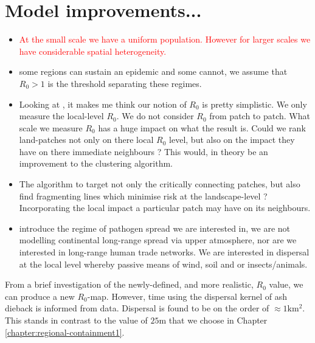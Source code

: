 \section{Model improvements...}
\begin{itemize}
    \item \textcolor{red}{At the small scale we have a uniform population. However for larger scales we have considerable spatial heterogeneity.}
    \item some regions can sustain an epidemic and some cannot, we assume that $R_0>1$ is the threshold separating these regimes.
    \item Looking at \cite{R0-perc-ref}, it makes me think our notion of $R_0$ is pretty simplistic. We only measure the local-level $R_0$. We do not consider $R_0$ from patch to patch. What scale we measure $R_0$ has a huge impact on what the result is. Could we rank land-patches not only on there local $R_0$ level, but also on the impact they have on there immediate neighbours ? This would, in theory be an improvement to the clustering algorithm.
    \item The algorithm to target not only the critically connecting patches, but also find fragmenting lines which minimise risk at the landscape-level ? Incorporating the local impact a particular patch may have on its neighbours.
    \item introduce the regime of pathogen spread we are interested in, we are not modelling continental long-range spread via upper atmosphere, nor are we interested in long-range human trade networks. We are interested in dispersal at the local level whereby passive means of wind, soil and or insects/animals. 
    
    
\end{itemize}
From a brief investigation of the newly-defined, %
and more realistic, $R_0$ value, we can produce a new $R_0$-map. %
However, time using the dispersal kernel of ash dieback is informed from data. Dispersal is found to be on the order of $\approx 1\mathrm{km^2}$. This stands in contrast to the value of $25\mathrm{m}$ that we choose in Chapter \ref{chapter:regional-containment1}.

